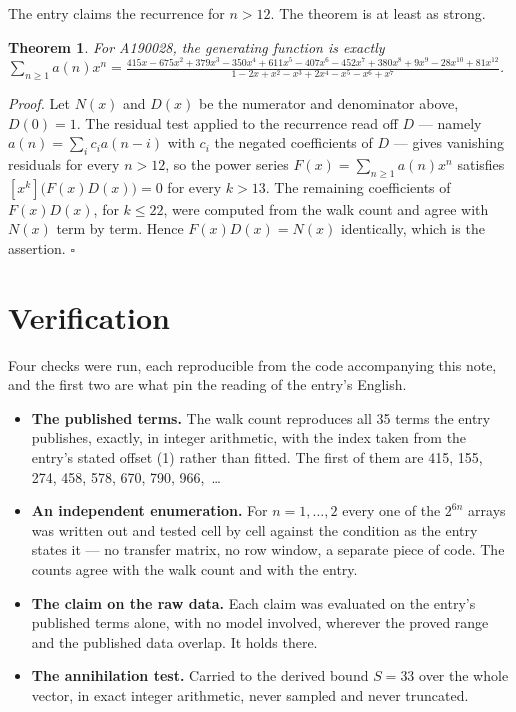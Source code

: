 \documentclass[11pt]{article}
\newtheorem{theorem}{Theorem}
\theoremstyle{definition}
\begin{document}
The entry claims the recurrence for $n > 12$. The theorem is at least as strong.

\begin{theorem} For A190028, the generating function is exactly $\sum_{n\ge 1} a(n)x^n = \frac{415x - 675x^{2} + 379x^{3} - 350x^{4} + 611x^{5} - 407x^{6} - 452x^{7} + 380x^{8} + 9x^{9} - 28x^{10} + 81x^{12}}{1 - 2x + x^{2} - x^{3} + 2x^{4} - x^{5} - x^{6} + x^{7}}$.\end{theorem}

{\itshape Proof.} Let $N(x)$ and $D(x)$ be the numerator and denominator above, $D(0)=1$. The residual test applied to the recurrence read off $D$ --- namely $a(n) = \sum_i c_i a(n-i)$ with $c_i$ the negated coefficients of $D$ --- gives vanishing residuals for every $n > 12$, so the power series $F(x)=\sum_{n\ge 1}a(n)x^n$ satisfies $[x^k]\bigl(F(x)D(x)\bigr) = 0$ for every $k > 13$. The remaining coefficients of $F(x)D(x)$, for $k \le 22$, were computed from the walk count and agree with $N(x)$ term by term. Hence $F(x)D(x) = N(x)$ identically, which is the assertion. $\square$

\section{Verification}

Four checks were run, each reproducible from the code accompanying this note, and the first two are what pin the reading of the entry's English.

\begin{itemize}

\item {\bfseries The published terms.} The walk count reproduces all 35 terms the entry publishes, exactly, in integer arithmetic, with the index taken from the entry's stated offset (1) rather than fitted. The first of them are 415, 155, 274, 458, 578, 670, 790, 966,~\dots

\item {\bfseries An independent enumeration.} For $n = 1,\dots,2$ every one of the $2^{6n}$ arrays was written out and tested cell by cell against the condition as the entry states it --- no transfer matrix, no row window, a separate piece of code. The counts agree with the walk count and with the entry.

\item {\bfseries The claim on the raw data.} Each claim was evaluated on the entry's published terms alone, with no model involved, wherever the proved range and the published data overlap. It holds there.

\item {\bfseries The annihilation test.} Carried to the derived bound $S = 33$ over the whole vector, in exact integer arithmetic, never sampled and never truncated.

\end{itemize}
\end{document}
